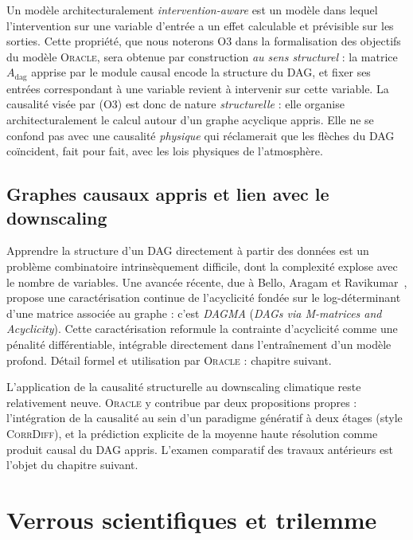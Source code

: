 \documentclass[14pt,a4paper,openany]{extreport}
\theoremstyle{definition}
\newcommand{\Oracle}{\textsc{Oracle}}
\newcommand{\CorrDiff}{\textsc{CorrDiff}}
\begin{document}
Un modèle architecturalement \emph{intervention-aware} est un modèle dans lequel l'intervention sur une variable d'entrée a un effet calculable et prévisible sur les sorties. Cette propriété, que nous noterons O3 dans la formalisation des objectifs du modèle \Oracle{}, sera obtenue par construction \emph{au sens structurel} : la matrice $A_{\mathrm{dag}}$ apprise par le module causal encode la structure du DAG, et fixer ses entrées correspondant à une variable revient à intervenir sur cette variable. La causalité visée par (O3) est donc de nature \emph{structurelle} : elle organise architecturalement le calcul autour d'un graphe acyclique appris. Elle ne se confond pas avec une causalité \emph{physique} qui réclamerait que les flèches du DAG coïncident, fait pour fait, avec les lois physiques de l'atmosphère.

\subsection{Graphes causaux appris et lien avec le downscaling}
\label{ssec:learned-dag}

Apprendre la structure d'un DAG directement à partir des données est un problème combinatoire intrinsèquement difficile, dont la complexité explose avec le nombre de variables. Une avancée récente, due à Bello, Aragam et Ravikumar~\cite{bello_dagma_2022}, propose une caractérisation continue de l'acyclicité fondée sur le log-déterminant d'une matrice associée au graphe : c'est \emph{DAGMA} (\emph{DAGs via M-matrices and Acyclicity}). Cette caractérisation reformule la contrainte d'acyclicité comme une pénalité différentiable, intégrable directement dans l'entraînement d'un modèle profond. Détail formel et utilisation par \Oracle{} : chapitre suivant.

L'application de la causalité structurelle au downscaling climatique reste relativement neuve. \Oracle{} y contribue par deux propositions propres : l'intégration de la causalité au sein d'un paradigme génératif à deux étages (style \CorrDiff{}), et la prédiction explicite de la moyenne haute résolution comme produit causal du DAG appris. L'examen comparatif des travaux antérieurs est l'objet du chapitre suivant.

\section{Verrous scientifiques et trilemme}
\label{sec:verrous}
\end{document}
